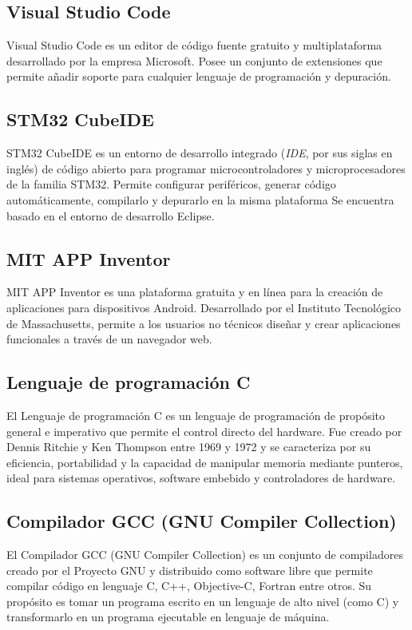 \subsection{Visual Studio Code}
Visual Studio Code \citep{VSCODE} es un editor de código fuente gratuito y multiplataforma desarrollado por la empresa Microsoft. Posee un conjunto de extensiones que permite añadir soporte para cualquier lenguaje de programación y depuración.
\subsection{STM32 CubeIDE}
STM32 CubeIDE \citep{STM32CUBE} es un entorno de desarrollo integrado ({\it{IDE}}, por sus siglas en inglés) de código abierto para programar microcontroladores y microprocesadores de la familia STM32. Permite configurar periféricos, generar código automáticamente, compilarlo y depurarlo en la misma plataforma Se encuentra basado en el entorno de desarrollo Eclipse. 
\subsection{MIT APP Inventor}
MIT APP Inventor \citep{MITAPP} es una plataforma gratuita y en línea para la creación de aplicaciones para dispositivos Android. Desarrollado por el Instituto Tecnológico de Massachusetts, permite a los usuarios no técnicos diseñar y crear aplicaciones funcionales a través de un navegador web.
\subsection{Lenguaje de programación C}
El Lenguaje de programación C \citep{C} es un lenguaje de programación de propósito general e imperativo que permite el control directo del hardware. Fue creado por Dennis Ritchie y Ken Thompson entre 1969 y 1972 y se caracteriza por su eficiencia, portabilidad y la capacidad de manipular memoria mediante punteros, ideal para sistemas operativos, software embebido y controladores de hardware. 
\subsection{Compilador GCC (GNU Compiler Collection)}
El Compilador GCC (GNU Compiler Collection) \citep{GCC} es un conjunto de compiladores creado por el Proyecto GNU y distribuido como software libre que permite compilar código en lenguaje C, C++, Objective-C, Fortran entre otros. Su propósito es tomar un programa escrito en un lenguaje de alto nivel (como C) y transformarlo en un programa ejecutable en lenguaje de máquina.
